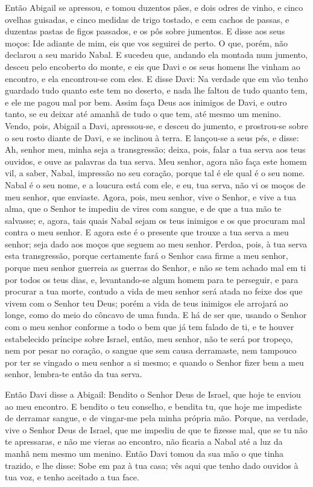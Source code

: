 Então Abigail se apressou, e tomou duzentos pães, e dois odres de
vinho, e cinco ovelhas guisadas, e cinco medidas de trigo tostado, e
cem cachos de passas, e duzentas pastas de figos passados, e os pôs
sobre jumentos. E disse aos seus moços: Ide adiante de mim,
eis que vos seguirei de perto. O que, porém, não declarou a seu
marido Nabal. E sucedeu que, andando ela montada num jumento,
desceu pelo encoberto do monte, e eis que Davi e os seus homens lhe
vinham ao encontro, e ela encontrou-se com eles. E disse
Davi: Na verdade que em vão tenho guardado tudo quanto este tem no
deserto, e nada lhe faltou de tudo quanto tem, e ele me pagou mal
por bem. Assim faça Deus aos inimigos de Davi, e outro tanto,
se eu deixar até amanhã de tudo o que tem, até mesmo um menino.
Vendo, pois, Abigail a Davi, apressou-se, e desceu do
jumento, e prostrou-se sobre o seu rosto diante de Davi, e se
inclinou à terra. E lançou-se a seus pés, e disse: Ah, senhor
meu, minha seja a transgressão; deixa, pois, falar a tua serva aos
teus ouvidos, e ouve as palavras da tua serva. Meu senhor,
agora não faça este homem vil, a saber, Nabal, impressão no seu
coração, porque tal é ele qual é o seu nome. Nabal é o seu nome, e a
loucura está com ele, e eu, tua serva, não vi os moços de meu
senhor, que enviaste. Agora, pois, meu senhor, vive o Senhor,
e vive a tua alma, que o Senhor te impediu de vires com sangue, e de
que a tua mão te salvasse; e, agora, tais quais Nabal sejam os teus
inimigos e os que procuram mal contra o meu senhor. E agora
este é o presente que trouxe a tua serva a meu senhor; seja dado aos
moços que seguem ao meu senhor. Perdoa, pois, à tua serva
esta transgressão, porque certamente fará o Senhor casa firme a meu
senhor, porque meu senhor guerreia as guerras do Senhor, e não se
tem achado mal em ti por todos os teus dias, e, levantando-se
algum homem para te perseguir, e para procurar a tua morte, contudo
a vida de meu senhor será atada no feixe dos que vivem com o Senhor
teu Deus; porém a vida de teus inimigos ele arrojará ao longe, como
do meio do côncavo de uma funda. E há de ser que, usando o
Senhor com o meu senhor conforme a todo o bem que já tem falado de
ti, e te houver estabelecido príncipe sobre Israel, então,
meu senhor, não te será por tropeço, nem por pesar no coração, o
sangue que sem causa derramaste, nem tampouco por ter se vingado o
meu senhor a si mesmo; e quando o Senhor fizer bem a meu senhor,
lembra-te então da tua serva.

Então Davi disse a Abigail: Bendito o Senhor Deus de Israel, que
hoje te enviou ao meu encontro. E bendito o teu conselho, e
bendita tu, que hoje me impediste de derramar sangue, e de vingar-me
pela minha própria mão. Porque, na verdade, vive o Senhor
Deus de Israel, que me impediu de que te fizesse mal, que se tu não
te apressaras, e não me vieras ao encontro, não ficaria a Nabal até
a luz da manhã nem mesmo um menino. Então Davi tomou da sua
mão o que tinha trazido, e lhe disse: Sobe em paz à tua casa; vês
aqui que tenho dado ouvidos à tua voz, e tenho aceitado a tua face.

